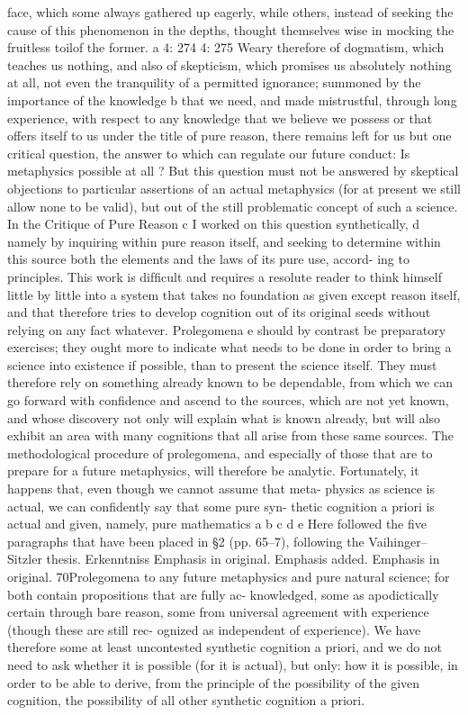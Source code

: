 face, which some always gathered up eagerly, while others, instead of
seeking the cause of this phenomenon in the depths, thought themselves
wise in mocking the fruitless toilof the former. a
4: 274
4: 275
Weary therefore of dogmatism, which teaches us nothing, and also
of skepticism, which promises us absolutely nothing at all, not even
the tranquility of a permitted ignorance; summoned by the importance
of the knowledge b that we need, and made mistrustful, through long
experience, with respect to any knowledge that we believe we possess or
that offers itself to us under the title of pure reason, there remains left
for us but one critical question, the answer to which can regulate our
future conduct: Is metaphysics possible at all ? But this question must not
be answered by skeptical objections to particular assertions of an actual
metaphysics (for at present we still allow none to be valid), but out of
the still problematic concept of such a science.
In the Critique of Pure Reason c I worked on this question synthetically, d
namely by inquiring within pure reason itself, and seeking to determine
within this source both the elements and the laws of its pure use, accord-
ing to principles. This work is difﬁcult and requires a resolute reader to
think himself little by little into a system that takes no foundation as given
except reason itself, and that therefore tries to develop cognition out of its
original seeds without relying on any fact whatever. Prolegomena e should
by contrast be preparatory exercises; they ought more to indicate what
needs to be done in order to bring a science into existence if possible,
than to present the science itself. They must therefore rely on something
already known to be dependable, from which we can go forward with
conﬁdence and ascend to the sources, which are not yet known, and
whose discovery not only will explain what is known already, but will
also exhibit an area with many cognitions that all arise from these same
sources. The methodological procedure of prolegomena, and especially
of those that are to prepare for a future metaphysics, will therefore be
analytic.
Fortunately, it happens that, even though we cannot assume that meta-
physics as science is actual, we can conﬁdently say that some pure syn-
thetic cognition a priori is actual and given, namely, pure mathematics
a
b
c
d
e
Here followed the ﬁve paragraphs that have been placed in §2 (pp. 65–7), following the
Vaihinger–Sitzler thesis.
Erkenntniss
Emphasis in original.
Emphasis added.
Emphasis in original.
70Prolegomena to any future metaphysics
and pure natural science; for both contain propositions that are fully ac-
knowledged, some as apodictically certain through bare reason, some
from universal agreement with experience (though these are still rec-
ognized as independent of experience). We have therefore some at least
uncontested synthetic cognition a priori, and we do not need to ask whether
it is possible (for it is actual), but only: how it is possible, in order to be able
to derive, from the principle of the possibility of the given cognition, the
possibility of all other synthetic cognition a priori.

